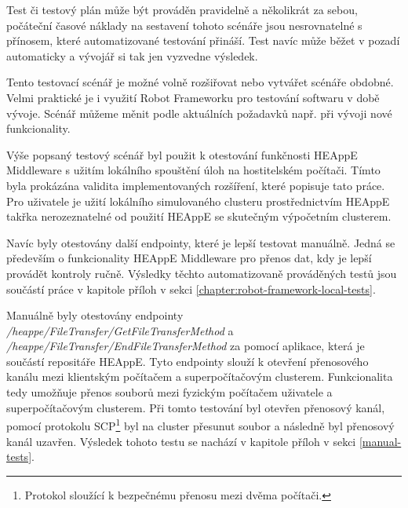 Test či testový plán může být prováděn pravidelně a několikrát za sebou, počáteční časové náklady na sestavení tohoto scénáře jsou nesrovnatelné s přínosem, které automatizované testování přináší. Test navíc může běžet v pozadí automaticky a vývojář si tak jen vyzvedne výsledek.


Tento testovací scénář je možné volně rozšiřovat nebo vytvářet scénáře obdobné. Velmi praktické je i využití Robot Frameworku pro testování softwaru v době vývoje. Scénář můžeme měnit podle aktuálních požadavků např. při vývoji nové funkcionality.

Výše popsaný testový scénář byl použit k otestování funkčnosti HEAppE Middleware s užitím lokálního spouštění úloh na hostitelském počítači. Tímto byla prokázána validita implementovaných rozšíření, které popisuje tato práce. Pro uživatele je užití lokálního simulovaného clusteru prostřednictvím HEAppE takřka nerozeznatelné od použití HEAppE se skutečným výpočetním clusterem.

Navíc byly otestovány další endpointy, které je lepší testovat manuálně. Jedná se především o funkcionality HEAppE Middleware pro přenos dat, kdy je lepší provádět kontroly ručně.
Výsledky těchto automatizovaně prováděných testů jsou součástí práce v kapitole příloh v sekci \ref{chapter:robot-framework-local-tests}. 

Manuálně byly otestovány endpointy \emph{/heappe/FileTransfer/GetFileTransferMethod} a \emph{/heappe/FileTransfer/EndFileTransferMethod} za pomocí aplikace, která je součástí repositáře HEAppE. Tyto endpointy slouží k otevření přenosového kanálu mezi klientským počítačem a superpočítačovým clusterem. Funkcionalita tedy umožňuje přenos souborů mezi fyzickým počítačem uživatele a superpočítačovým clusterem. Při tomto testování byl otevřen přenosový kanál, pomocí protokolu SCP\footnote{Protokol sloužící k bezpečnému přenosu mezi dvěma počítači.} byl na cluster přesunut soubor a následně byl přenosový kanál uzavřen. Výsledek tohoto testu se nachází v kapitole příloh v sekci \ref{manual-tests}.

